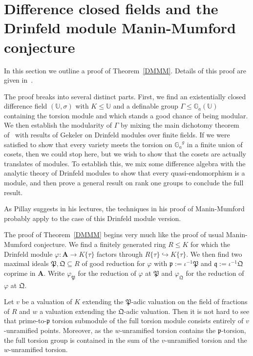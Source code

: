 \documentclass{amsart}
\newcommand{\Ga}{{{\mathbb G}_a}}
\newcommand{\UU}{{\mathbb U}}
\newcommand{\fp}{{\mathfrak p}}
\newcommand{\fq}{{\mathfrak q}}
\newcommand{\fP}{{\mathfrak P}}
\newcommand{\fQ}{{\mathfrak Q}}
\newcommand{\bA}{{\mathbf A}}
\theoremstyle{definition}
\theoremstyle{remark}
\begin{document}
\section{Difference closed fields and the Drinfeld module Manin-Mumford conjecture}
\label{ACFADMM}

In this section we outline a proof of Theorem~\ref{DMMM}.  Details of this 
proof are given in~\cite{ScDMM}.


The proof breaks into several distinct parts. First, we find an existentially closed
difference field $(\UU, \sigma)$ with $K \leq \UU$ and a definable group $\Gamma \leq \Ga(\UU)$
containing the torsion module and which stands a good chance of being modular.  
We then establish the modularity of 
$\Gamma$ by mixing the main dichotomy theorem of~\cite{CHP} with results of Gekeler on 
Drinfeld modules over finite fields.  If we were satisfied to show that 
every variety meets the torsion on $\Ga^g$ in a finite union of cosets, then we could stop here, but
we wish to show that the cosets are actually translates of modules.  To establish this, we mix some 
difference algebra with the analytic theory of Drinfeld modules to show that every quasi-endomorphism
is a module, and then prove a general result on rank one groups to conclude the full result.  



As Pillay suggests in his lectures, the techniques in his proof of Manin-Mumford probably 
apply to the case of this Drinfeld module version.  


The proof of Theorem~\ref{DMMM} begins very much like the proof of usual Manin-Mumford
conjecture.  We find a finitely generated ring $R \leq K$ for which the Drinfeld
module $\varphi:\bA \to K \{ \tau \}$ factors through $R \{ \tau \} \hookrightarrow K \{ \tau \}$.
We then find two maximal ideals $\fP, \fQ \subseteq R$ of good reduction for $\varphi$ with 
$\fp := \iota^{-1} \fP$ and $\fq := \iota^{-1} \fQ$ coprime in $\bA$.   Write $\varphi_\fP$
for the reduction of $\varphi$ at $\fP$ and $\varphi_\fQ$ for the reduction of $\varphi$ at $\fQ$.

Let $v$ be a 
valuation of $K$ extending the $\fP$-adic valuation on the field of fractions of $R$ 
and $w$ a valuation extending the $\fQ$-adic valuation.  Then it is not hard to see that 
prime-to-$\fp$ torsion submodule of the full torsion module consists entirely of 
$v$-unramified points.  Moreover, as the $w$-unramified torsion contains the $\fp$-torsion,  
the full torsion group is contained in the sum of the $v$-unramified
torsion and the $w$-unramified torsion.   
\end{document}
